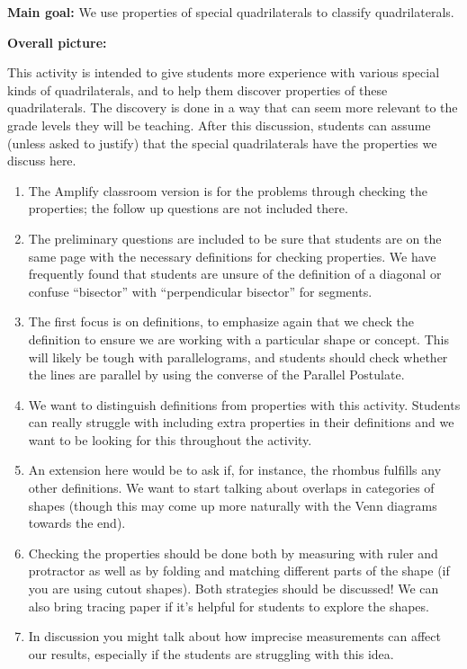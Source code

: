 \documentclass[noauthor, nooutcomes]{ximera}
\begin{document}
\begin{instructorNotes}

{\bf Main goal:} We use properties of special quadrilaterals to classify quadrilaterals.


{\bf Overall picture:} 

This activity is intended to give students more experience with various special kinds of quadrilaterals, and to help them discover properties of these quadrilaterals.  The discovery is done in a way that can seem more relevant to the grade levels they will be teaching. After this discussion, students can assume (unless asked to justify) that the special quadrilaterals have the properties we discuss here.

\begin{enumerate}
\item The Amplify classroom version is for the problems through checking the properties; the follow up questions are not included there.
\item The preliminary questions are included to be sure that students are on the same page with the necessary definitions for checking properties. We have frequently found that students are unsure of the definition of a diagonal or confuse ``bisector'' with ``perpendicular bisector'' for segments.
\item The first focus is on definitions, to emphasize again that we check the definition to ensure we are working with a particular shape or concept. This will likely be tough with parallelograms, and students should check whether the lines are parallel by using the converse of the Parallel Postulate.
\item We want to distinguish definitions from properties with this activity. Students can really struggle with including extra properties in their definitions and we want to be looking for this throughout the activity.
\item An extension here would be to ask if, for instance, the rhombus fulfills any other definitions. We want to start talking about overlaps in categories of shapes (though this may come up more naturally with the Venn diagrams towards the end).
\item Checking the properties should be done both by measuring with ruler and protractor as well as by folding and matching different parts of the shape (if you are using cutout shapes). Both strategies should be discussed! We can also bring tracing paper if it's helpful for students to explore the shapes.
\item In discussion you might talk about how imprecise measurements can affect our results, especially if the students are struggling with this idea.

\end{enumerate}
\end{instructorNotes}
\end{document}
